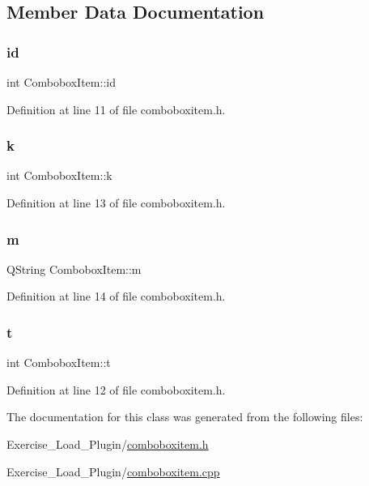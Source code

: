 \subsection{Member Data Documentation}
\mbox{\label{classComboboxItem_af3201016f4c607111881691f44d10d4f}} 
\subsubsection{\texorpdfstring{id}{id}}
{\footnotesize\ttfamily int Combobox\+Item\+::id}



Definition at line 11 of file comboboxitem.\+h.

\mbox{\label{classComboboxItem_adecde5389a40dc89b0f83a8936c3635f}} 
\subsubsection{\texorpdfstring{k}{k}}
{\footnotesize\ttfamily int Combobox\+Item\+::k}



Definition at line 13 of file comboboxitem.\+h.

\mbox{\label{classComboboxItem_a515e46e92e92c520e7d1b38f168b7126}} 
\subsubsection{\texorpdfstring{m}{m}}
{\footnotesize\ttfamily Q\+String Combobox\+Item\+::m}



Definition at line 14 of file comboboxitem.\+h.

\mbox{\label{classComboboxItem_ab16f8c38febd0f7f3a0ba647acfa4d45}} 
\subsubsection{\texorpdfstring{t}{t}}
{\footnotesize\ttfamily int Combobox\+Item\+::t}



Definition at line 12 of file comboboxitem.\+h.



The documentation for this class was generated from the following files\+:\begin{DoxyCompactItemize}
\item 
Exercise\+\_\+\+Load\+\_\+\+Plugin/\hyperlink{Exercise__Load__Plugin_2comboboxitem_8h}{comboboxitem.\+h}\item 
Exercise\+\_\+\+Load\+\_\+\+Plugin/\hyperlink{Exercise__Load__Plugin_2comboboxitem_8cpp}{comboboxitem.\+cpp}\end{DoxyCompactItemize}
